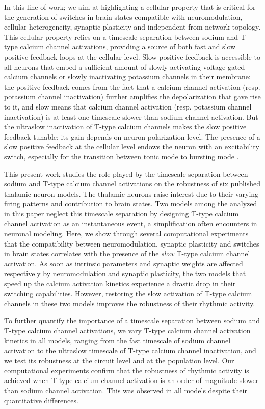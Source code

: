 In this line of work; we aim at highlighting a cellular property that is critical for the generation of switches in brain states compatible with neuromodulation, cellular heterogeneity, synaptic plasticity and independent from network topology.  This cellular property relies on a timescale separation between sodium and T-type calcium channel activations, providing a source of both fast and slow positive feedback loops at the cellular level.  Slow positive feedback is accessible to all neurons that embed a sufficient amount of slowly activating voltage-gated calcium channels or slowly inactivating potassium channels in their membrane: the positive feedback comes from the fact that a calcium channel activation (resp. potassium channel inactivation) further amplifies the depolarization that gave rise to it, and slow means that calcium channel activation (resp. potassium channel inactivation) is at least one timescale slower than sodium channel activation.  But the ultraslow inactivation of T-type calcium channels makes the slow positive feedback tunable: its gain depends on neuron polarization level.  The presence of a slow positive feedback at the cellular level endows the neuron with an excitability switch, especially for the transition between tonic mode to bursting mode \citep{franci_balance_2013}.



This present work studies the role played by the timescale separation between sodium and T-type calcium channel activations on the robustness of six published  thalamic neuron models. The thalamic neurons raise interest due to their varying firing patterns and contribution to brain states. 
Two models among the analyzed in this paper neglect this timescale separation by designing T-type calcium channel activation as an instantaneous event, a simplification often encounters in neuronal modeling.  Here, we show through several computational experiments that the compatibility between neuromodulation, synaptic plasticity and switches in brain states correlates with the presence of the \textit{slow} T-type calcium channel activation. As soon as intrinsic parameters and synaptic weights are  affected respectively by neuromodulation and synaptic plasticity, the two models that speed up the calcium activation kinetics experience a drastic drop in their switching capabilities.  However,  restoring the slow activation of T-type calcium channels in these two models improves the robustness of their rhythmic activity. 

To further quantify the importance of a timescale separation between sodium and T-type calcium channel activations, we vary T-type calcium channel activation kinetics in all models, ranging from the fast timescale of sodium channel activation to the ultraslow timescale of T-type calcium channel inactivation, and  we test its robustness at the circuit level and at the population level. Our computational experiments confirm that the robustness of rhythmic activity is achieved when T-type calcium channel activation is an order of magnitude slower than sodium channel activation. This was observed in all models despite their quantitative differences.  

